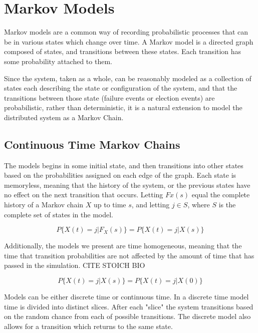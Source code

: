 \section{Markov Models}

Markov models are a common way of recording probabilistic processes that can
be in various states which change over time. A Markov model is a directed
graph composed of states, and transitions between these states. Each
transition has some probability attached to them.

Since the system, taken as a whole, can be reasonably modeled as a collection of
states each describing the state or configuration of the system, and that the
transitions between those state (failure events or election events) are probabilistic,
rather than deterministic, it is a natural extension to model the distributed
system as a Markov Chain.

\subsection{Continuous Time Markov Chains}

The models begins in some initial state, and then transitions into other states
based on the probabilities assigned on each edge of the graph. Each state is
memoryless, meaning that the history of the system, or the previous states have
no effect on the next transition that occurs. Letting $Fx(s)$ equal the complete
history of a Markov chain $X$ up to time $s$, and letting $j \in S$, where $S$
is the complete set of states in the model.

\begin{equation}
P\{ X(t)=j | F_X(s) \} = P\{ X(t)=j | X(s) \}
\end{equation}

Additionally, the models we present are time homogeneous, meaning that the
time that transition probabilities are not affected by the amount of time that
has passed in the simulation. CITE STOICH BIO

\begin{equation}
P\{ X(t)=j | X(s) \} = P\{ X(t)=j | X(0) \}
\end{equation}

Models can be either discrete time or continuous time. In a discrete time model
time is divided into distinct slices. After each "slice" the system transitions
based on the random chance from each of possible transitions. The discrete model
also allows for a transition which returns to the same state.

